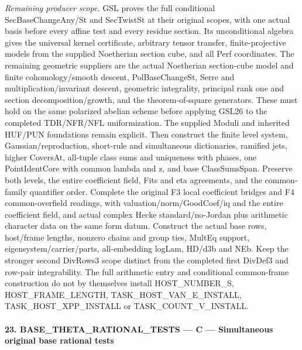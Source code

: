 \documentclass[11pt,a4paper]{article}
\numberwithin{equation}{section}
\theoremstyle{remark}\newtheorem{remark}[theorem]{Remark}
\begin{document}
\emph{Remaining producer scope.} GSL proves the full conditional SecBaseChangeAny/St and SecTwistSt at their original scopes, with one actual basis before every affine test and every residue section. Its unconditional algebra gives the universal kernel certificate, arbitrary tensor transfer, finite-projective models from the supplied Noetherian section cube, and all Perf coordinates. The remaining geometric suppliers are the actual Noetherian section-cube model and finite cohomology/smooth descent, PolBaseChangeSt, Serre and multiplication/invariant descent, geometric integrality, principal rank one and section decomposition/growth, and the theorem-of-square generators. These must hold on the same polarized abelian scheme before applying GSL26 to the completed TDR/NFR/NFL uniformization. The supplied Moduli and inherited HUF/PUN foundations remain explicit. Then construct the finite level system, Gaussian/reproduction, short-rule and simultaneous dictionaries, ramified jets, higher CoversAt, all-tuple class sums and uniqueness with phases, one PointIdentCore with common lambda and z, and base ClassSumsSpan. Preserve both levels, the entire coefficient field, Fits and eta agreements, and the common-family quantifier order. Complete the original F3 local coefficient bridges and F4 common-overfield readings, with valuation/norm/GoodCoef/iq and the entire coefficient field, and actual complex Hecke standard/no-Jordan plus arithmetic character data on the same form datum. Construct the actual base rows, host/frame lengths, nonzero chains and group ties, MultEq support, eigensystem/carrier/parts, all-embedding logLam, HD/d3b and NEb. Keep the stronger second DivRows3 scope distinct from the completed first DivDef3 and row-pair integrability. The full arithmetic entry and conditional common-frame construction do not by themselves install HOST\_\allowbreak NUMBER\_\allowbreak S, HOST\_\allowbreak FRAME\_\allowbreak LENGTH, TASK\_\allowbreak HOST\_\allowbreak VAN\_\allowbreak E\_\allowbreak INSTALL, TASK\_\allowbreak HOST\_\allowbreak XPP\_\allowbreak INSTALL or TASK\_\allowbreak COUNT\_\allowbreak V\_\allowbreak INSTALL.



\paragraph{23. BASE\_\allowbreak THETA\_\allowbreak RATIONAL\_\allowbreak TESTS — C — Simultaneous original base rational tests}
\end{document}
